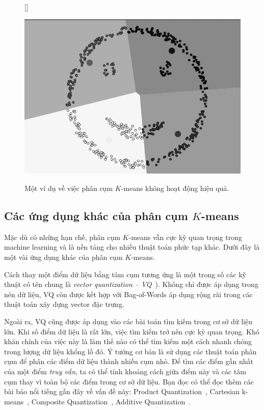 \begin{figure}[t]
    [\FBwidth]
    {\caption{ 
        Một ví dụ về việc phân cụm $K$-means không hoạt động hiệu quả.
    }
    \label{fig:4_face}}
    { %
    \includegraphics[width=.3\textwidth]{Chapters/03_SimpleML/4_kmeans/smile_face_gray.png}
    }
\end{figure}

\subsection{Các ứng dụng khác của phân cụm $K$-means}
Mặc dù có những hạn chế, phân cụm $K$-means vẫn cực kỳ quan trọng trong machine
learning và là nền tảng cho nhiều thuật toán phức tạp khác. Dưới đây là một vài ứng dụng khác của phân cụm $K$-means. 

    Cách thay một điểm dữ liệu bằng tâm cụm tương ứng là một trong số các
    kỹ thuật có tên chung là \textit{vector quantization  --
    VQ}~\cite{arya1993algorithms}). Không chỉ được áp dụng trong nén dữ liệu, VQ
    còn được kết hợp với Bag-of-Words\cite{lazebnik2006beyond} áp dụng rộng rãi
    trong các thuật toán xây dựng vector đặc trưng.


    Ngoài ra, VQ cũng được áp dụng vào các bài toán tìm kiếm trong cơ sở dữ liệu
    lớn. Khi số điểm dữ liệu là rất lớn, việc tìm kiếm trở nên cực kỳ quan
    trọng. Khó khăn chính của việc này là làm thế nào có thể tìm kiếm một cách
    nhanh chóng trong lượng dữ liệu khổng lồ đó. Ý tưởng cơ bản là sử dụng các
    thuật toán phân cụm để phân các điểm dữ liệu thành nhiều cụm nhỏ. Để tìm các
    điểm gần nhất của một điểm \textit{truy vấn}, ta có thể tính khoảng cách
    giữa điểm này và các tâm cụm thay vì toàn bộ các
    điểm trong cơ sở dữ liệu. Bạn đọc có thể đọc thêm các bài báo nổi tiếng gần
    đây về vấn đề này: Product Quantization~\cite{jegou2011product}, Cartesian
    k-means~\cite{norouzi2013cartesian,johnson2017billion}, Composite
    Quantization~\cite{zhang2014composite}, Additive
    Quantization~\cite{babenko2014additive}.


